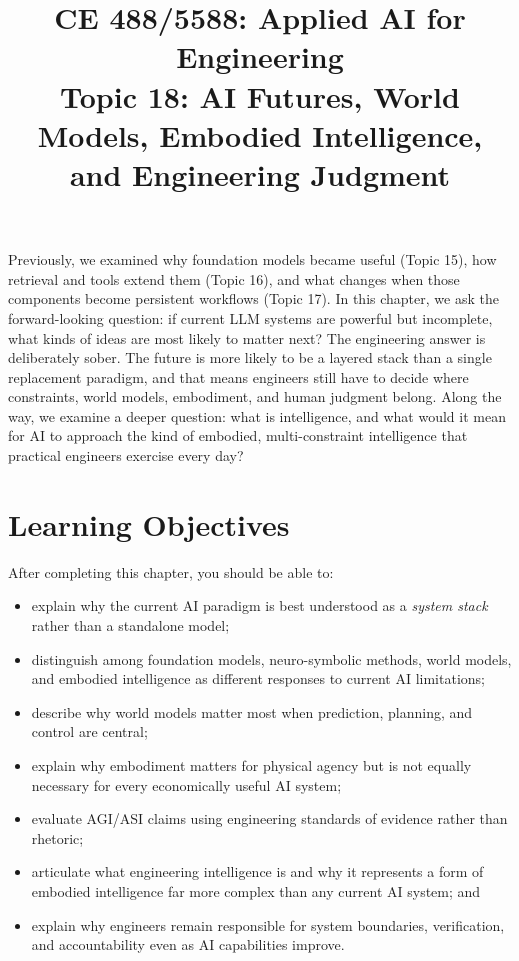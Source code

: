 \documentclass[12pt]{article}
\begin{document}
\doublespacing

\title{CE 488/5588: Applied AI for Engineering\\ \large Topic 18: AI Futures, World Models, Embodied Intelligence, and Engineering Judgment}
\author{}
\date{}
\maketitle

\begin{ch-box}
Previously, we examined why foundation models became useful (Topic 15), how retrieval and tools extend them (Topic 16), and what changes when those components become persistent workflows (Topic 17). In this chapter, we ask the forward-looking question: if current LLM systems are powerful but incomplete, what kinds of ideas are most likely to matter next? The engineering answer is deliberately sober. The future is more likely to be a layered stack than a single replacement paradigm, and that means engineers still have to decide where constraints, world models, embodiment, and human judgment belong. Along the way, we examine a deeper question: what is intelligence, and what would it mean for AI to approach the kind of embodied, multi-constraint intelligence that practical engineers exercise every day?
\end{ch-box}

\section*{Learning Objectives}
After completing this chapter, you should be able to:
\begin{itemize}
    \item explain why the current AI paradigm is best understood as a \emph{system stack} rather than a standalone model;
    \item distinguish among foundation models, neuro-symbolic methods, world models, and embodied intelligence as different responses to current AI limitations;
    \item describe why world models matter most when prediction, planning, and control are central;
    \item explain why embodiment matters for physical agency but is not equally necessary for every economically useful AI system;
    \item evaluate AGI/ASI claims using engineering standards of evidence rather than rhetoric;
    \item articulate what engineering intelligence is and why it represents a form of embodied intelligence far more complex than any current AI system; and
    \item explain why engineers remain responsible for system boundaries, verification, and accountability even as AI capabilities improve.
\end{itemize}
\end{document}
